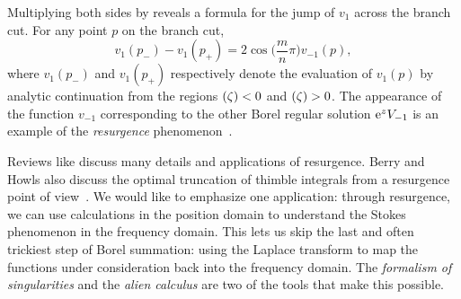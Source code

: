 \documentclass[pdftex]{sigma}
\let\Im\relax
\DeclareMathOperator{\Im}{Im}
\numberwithin{equation}{section}
\begin{document}
Multiplying both sides by  reveals a formula for the jump of $v_1$ across the branch cut. For any point $p$ on the branch cut,
\begin{equation}\label{eqn:resurg-rel-1}
v_1(p_-) - v_1(p_+) = 2\cos\bigl(\frac{m}{n}\pi\bigr) v_{-1}(p),
\end{equation}
where $v_1(p_-)$ and $v_1(p_+)$ respectively denote the evaluation of $v_1(p)$ by analytic continuation from the regions $\Im(\zeta) < 0$ and $\Im(\zeta) > 0$. The appearance of the function $v_{-1}$ corresponding to the other Borel regular solution ${\rm e}^z V_{-1}$ is an example of the {\em resurgence} phenomenon~\cite{EcalleI,EcalleII,EcalleIII}.

Reviews like \cite{aniceto2019primer,Dorigoni,diverg-resurg-i} discuss many details and applications of resurgence. Berry and Howls also discuss the optimal truncation of thimble integrals from a resurgence point of view~\cite{Berry_Howls}. We would like to emphasize one application: through resurgence, we can use calculations in the position domain to understand the Stokes phenomenon in the frequency domain. This lets us skip the last and often trickiest step of Borel summation: using the Laplace transform to map the functions under consideration back into the frequency domain. The {\em formalism of singularities} and the {\em alien calculus} are two of the tools that make this possible.
\end{document}
